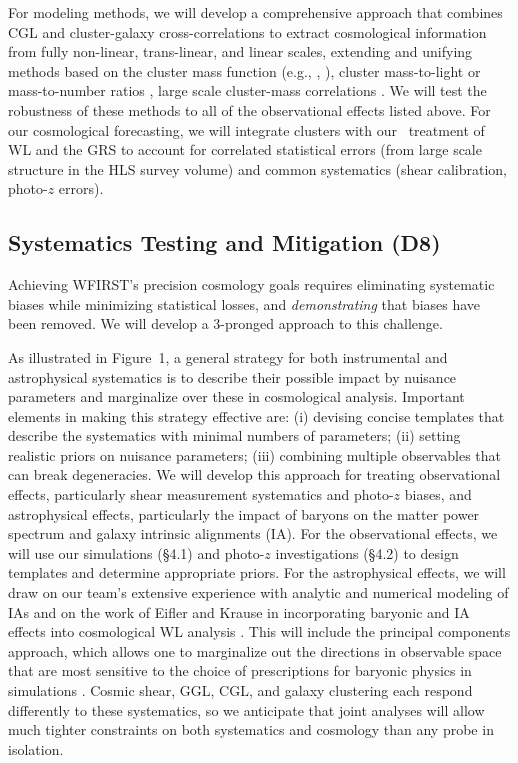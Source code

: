 For modeling methods, we will develop a comprehensive approach that combines CGL and cluster-galaxy cross-correlations
to extract cosmological information from fully non-linear, trans-linear,
and linear scales, extending and unifying methods based on the
cluster mass function (e.g., \cite{Rozo2010}, \cite{Mantz2015}), cluster mass-to-light
or mass-to-number ratios \cite{Tinker2005,Tinker2012},  large scale
cluster-mass correlations \cite{Zu2014}.
We will test the robustness of these methods to all of the observational
effects listed above.
For our cosmological forecasting, we will integrate clusters with our
\CoLi\ treatment of WL and the GRS to account for
correlated statistical errors (from large scale structure in the HLS
survey volume) and common systematics (shear calibration, photo-$z$ errors).

\subsection{Systematics Testing and Mitigation (D8)}

Achieving WFIRST's precision cosmology goals requires eliminating systematic biases
while minimizing statistical losses, and {\it demonstrating} that biases have been
removed.  We will develop a 3-pronged approach to this challenge.

As illustrated in Figure~1, a general strategy for both instrumental and astrophysical
systematics is to describe their possible impact by nuisance parameters and
marginalize over these in cosmological analysis.  Important elements in making
this strategy effective are:
(i) devising concise templates that describe the systematics with minimal
numbers of parameters;
(ii) setting realistic priors on nuisance parameters;
(iii) combining multiple observables that can break degeneracies.
We will develop this approach for treating observational effects,
particularly shear measurement systematics and photo-$z$ biases,
and astrophysical effects, particularly the impact of baryons
on the matter power spectrum \cite{jzl2006,rzk2008,dsb2011,shs2011}
and galaxy intrinsic alignments (IA).  For the observational effects,
we will use our simulations (\S 4.1) and photo-$z$ investigations
(\S 4.2) to design templates and determine appropriate priors.
For the astrophysical effects, we will draw on our team's extensive
experience with analytic and numerical modeling of IAs
\cite{Hirata2004,Mandelbaum2006,Hirata2007,Mandelbaum2011,Heymans13,Kiessling2015,
Kirk2015,Singh2015,Tenneti2015}
and on the work of Eifler and Krause in incorporating baryonic and
IA effects into cosmological WL analysis \cite{Laszlo2011,Kirk2011,Eifler2014,Krause2015}.
This will include the principal components approach, which allows one to
marginalize out the directions in observable space that are most sensitive
to the choice of prescriptions for baryonic physics in simulations
\cite{Eifler2014}.
Cosmic shear, GGL, CGL, and galaxy clustering each respond differently
to these systematics, so we anticipate that joint analyses will allow
much tighter constraints on both systematics and cosmology than any
probe in isolation.


